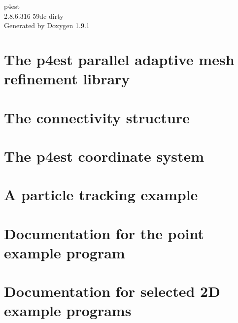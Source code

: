 \let\mypdfximage\pdfximage\def\pdfximage{\immediate\mypdfximage}\documentclass[twoside]{book}
\newcommand{\+}{\discretionary{\mbox{\scriptsize$\hookleftarrow$}}{}{}}
\newcommand{\clearemptydoublepage}{%
  \newpage{\pagestyle{empty}\cleardoublepage}%
}
\begin{document}
\raggedbottom

\hypersetup{pageanchor=false,
             bookmarksnumbered=true,
             pdfencoding=unicode
            }
\begin{titlepage}
\vspace*{7cm}
\begin{center}%
{\Large p4est \\[1ex]\large 2.\+8.\+6.\+316-\/59dc-\/dirty }\\
\vspace*{1cm}
{\large Generated by Doxygen 1.9.1}\\
\end{center}
\end{titlepage}
\clearemptydoublepage
{}
\tableofcontents
\clearemptydoublepage
{}
\hypersetup{pageanchor=true}

\chapter{The p4est parallel adaptive mesh refinement library}
\label{index}\hypertarget{index}{}
\chapter{The connectivity structure}
\label{connectivity}

\chapter{The p4est coordinate system}
\label{forest_coordinates}

\chapter{A particle tracking example}
\label{example_particles}

\chapter{Documentation for the point example program}
\label{example_points}

\chapter{Documentation for selected 2D example programs}
\label{example_simple2}

\end{document}
